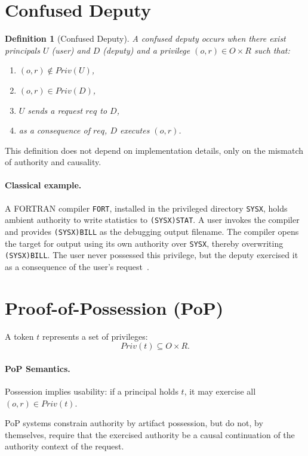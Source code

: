 \documentclass[11pt]{article}
\newtheorem{definition}{Definition}
\begin{document}
\section{Confused Deputy}

\begin{definition}[Confused Deputy]\label{def:confused}
A confused deputy occurs when there exist principals $U$ (user) and $D$ (deputy)
and a privilege $(o,r) \in O \times R$ such that:
\begin{enumerate}
    \item $(o,r) \notin Priv(U)$,
    \item $(o,r) \in Priv(D)$,
    \item $U$ sends a request $req$ to $D$,
    \item as a consequence of $req$, $D$ executes $(o,r)$.
\end{enumerate}
\end{definition}

This definition does not depend on implementation details,
only on the mismatch of authority and causality.

\paragraph{Classical example.}
A FORTRAN compiler \texttt{FORT}, installed in the privileged directory
\texttt{SYSX}, holds ambient authority to write statistics to
\texttt{(SYSX)STAT}. A user invokes the compiler and provides
\texttt{(SYSX)BILL} as the debugging output filename. The compiler opens the
target for output using its own authority over \texttt{SYSX}, thereby
overwriting \texttt{(SYSX)BILL}. The user never possessed this privilege, but
the deputy exercised it as a consequence of the user's request~\cite{hardy1988confused}.

\section{Proof-of-Possession (PoP)}

A token $t$ represents a set of privileges:
\[
Priv(t) \subseteq O \times R.
\]

\paragraph{PoP Semantics.}
Possession implies usability:
if a principal holds $t$, it may exercise all $(o,r)\in Priv(t)$.

PoP systems constrain authority by artifact possession, but do not, by
themselves, require that the exercised authority be a causal continuation of
the authority context of the request.
\end{document}
